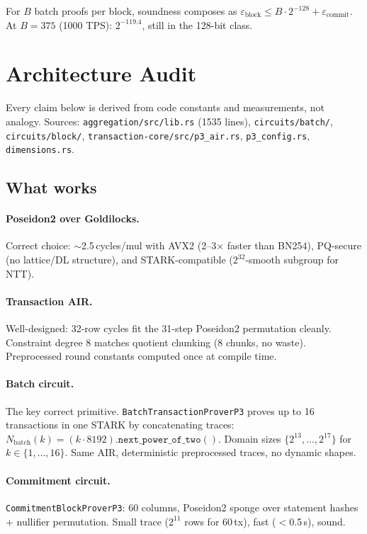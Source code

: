\documentclass[11pt]{article}
\begin{document}
For $B$ batch proofs per block, soundness composes as
$\varepsilon_{\mathrm{block}} \le B \cdot 2^{-128} + \varepsilon_{\mathrm{commit}}$.
At $B = 375$ (1000 TPS): $2^{-119.4}$, still in the 128-bit class.

\section{Architecture Audit}

Every claim below is derived from code constants and measurements, not
analogy. Sources: \texttt{aggregation/src/lib.rs} (1535 lines),
\texttt{circuits/batch/}, \texttt{circuits/block/},
\texttt{transaction-core/src/p3\_air.rs}, \texttt{p3\_config.rs},
\texttt{dimensions.rs}.

\subsection{What works}

\paragraph{Poseidon2 over Goldilocks.}
Correct choice: $\sim$2.5\,cycles/mul with AVX2 (2--3$\times$ faster than
BN254), PQ-secure (no lattice/DL structure), and STARK-compatible
($2^{32}$-smooth subgroup for NTT).

\paragraph{Transaction AIR.}
Well-designed: 32-row cycles fit the 31-step Poseidon2 permutation cleanly.
Constraint degree 8 matches quotient chunking (8 chunks, no waste).
Preprocessed round constants computed once at compile time.

\paragraph{Batch circuit.}
The key correct primitive. \texttt{BatchTransactionProverP3} proves up to 16
transactions in one STARK by concatenating traces:
$N_{\mathrm{batch}}(k) = (k \cdot 8192).\texttt{next\_power\_of\_two}()$.
Domain sizes $\{2^{13}, \ldots, 2^{17}\}$ for $k \in \{1, \ldots, 16\}$.
Same AIR, deterministic preprocessed traces, no dynamic shapes.

\paragraph{Commitment circuit.}
\texttt{CommitmentBlockProverP3}: 60 columns, Poseidon2 sponge over statement
hashes + nullifier permutation. Small trace ($2^{11}$ rows for 60\,tx),
fast ($<$0.5\,s), sound.
\end{document}
